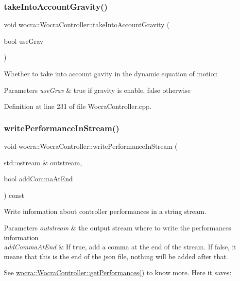 \subsubsection{\texorpdfstring{take\+Into\+Account\+Gravity()}{takeIntoAccountGravity()}}
{\footnotesize\ttfamily void wocra\+::\+Wocra\+Controller\+::take\+Into\+Account\+Gravity (\begin{DoxyParamCaption}\item[{bool}]{use\+Grav }\end{DoxyParamCaption})}

Whether to take into account gavity in the dynamic equation of motion


\begin{DoxyParams}{Parameters}
{\em use\+Grav} & {\ttfamily true} if gravity is enable, {\ttfamily false} otherwise \\
\hline
\end{DoxyParams}


Definition at line 231 of file Wocra\+Controller.\+cpp.

\hypertarget{classwocra_1_1WocraController_a9b296a995ba10ef66cc4416f34f4b675}{}\label{classwocra_1_1WocraController_a9b296a995ba10ef66cc4416f34f4b675} 
\subsubsection{\texorpdfstring{write\+Performance\+In\+Stream()}{writePerformanceInStream()}}
{\footnotesize\ttfamily void wocra\+::\+Wocra\+Controller\+::write\+Performance\+In\+Stream (\begin{DoxyParamCaption}\item[{std\+::ostream \&}]{outstream,  }\item[{bool}]{add\+Comma\+At\+End }\end{DoxyParamCaption}) const}

Write information about controller performances in a string stream.


\begin{DoxyParams}{Parameters}
{\em outstream} & the output stream where to write the performances information\\
\hline
{\em add\+Comma\+At\+End} & If true, add a comma at the end of the stream. If false, it means that this is the end of the json file, nothing will be added after that.\\
\hline
\end{DoxyParams}
See \hyperlink{classwocra_1_1WocraController_a4023613cae33e5f490babbc6d162204d}{wocra\+::\+Wocra\+Controller\+::get\+Performances()} to know more. Here it saves\+:


